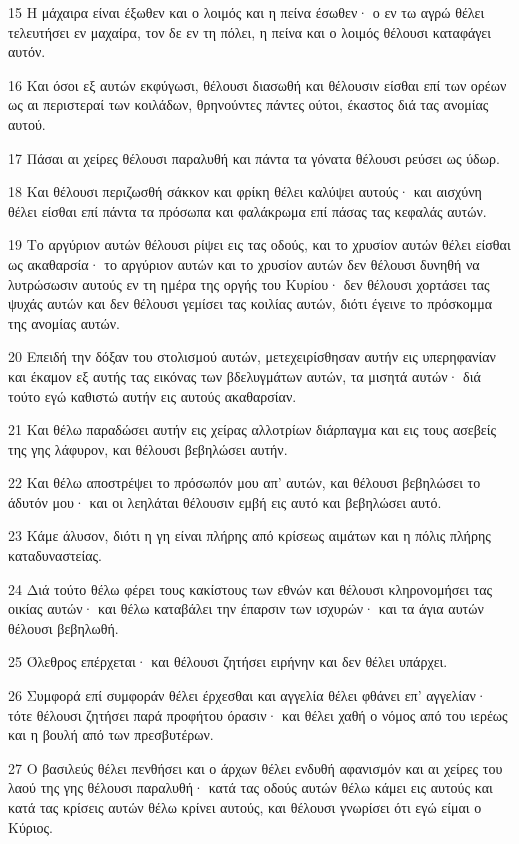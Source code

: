 \par 15 Η μάχαιρα είναι έξωθεν και ο λοιμός και η πείνα έσωθεν· ο εν τω αγρώ θέλει τελευτήσει εν μαχαίρα, τον δε εν τη πόλει, η πείνα και ο λοιμός θέλουσι καταφάγει αυτόν.
\par 16 Και όσοι εξ αυτών εκφύγωσι, θέλουσι διασωθή και θέλουσιν είσθαι επί των ορέων ως αι περιστεραί των κοιλάδων, θρηνούντες πάντες ούτοι, έκαστος διά τας ανομίας αυτού.
\par 17 Πάσαι αι χείρες θέλουσι παραλυθή και πάντα τα γόνατα θέλουσι ρεύσει ως ύδωρ.
\par 18 Και θέλουσι περιζωσθή σάκκον και φρίκη θέλει καλύψει αυτούς· και αισχύνη θέλει είσθαι επί πάντα τα πρόσωπα και φαλάκρωμα επί πάσας τας κεφαλάς αυτών.
\par 19 Το αργύριον αυτών θέλουσι ρίψει εις τας οδούς, και το χρυσίον αυτών θέλει είσθαι ως ακαθαρσία· το αργύριον αυτών και το χρυσίον αυτών δεν θέλουσι δυνηθή να λυτρώσωσιν αυτούς εν τη ημέρα της οργής του Κυρίου· δεν θέλουσι χορτάσει τας ψυχάς αυτών και δεν θέλουσι γεμίσει τας κοιλίας αυτών, διότι έγεινε το πρόσκομμα της ανομίας αυτών.
\par 20 Επειδή την δόξαν του στολισμού αυτών, μετεχειρίσθησαν αυτήν εις υπερηφανίαν και έκαμον εξ αυτής τας εικόνας των βδελυγμάτων αυτών, τα μισητά αυτών· διά τούτο εγώ καθιστώ αυτήν εις αυτούς ακαθαρσίαν.
\par 21 Και θέλω παραδώσει αυτήν εις χείρας αλλοτρίων διάρπαγμα και εις τους ασεβείς της γης λάφυρον, και θέλουσι βεβηλώσει αυτήν.
\par 22 Και θέλω αποστρέψει το πρόσωπόν μου απ' αυτών, και θέλουσι βεβηλώσει το άδυτόν μου· και οι λεηλάται θέλουσιν εμβή εις αυτό και βεβηλώσει αυτό.
\par 23 Κάμε άλυσον, διότι η γη είναι πλήρης από κρίσεως αιμάτων και η πόλις πλήρης καταδυναστείας.
\par 24 Διά τούτο θέλω φέρει τους κακίστους των εθνών και θέλουσι κληρονομήσει τας οικίας αυτών· και θέλω καταβάλει την έπαρσιν των ισχυρών· και τα άγια αυτών θέλουσι βεβηλωθή.
\par 25 Όλεθρος επέρχεται· και θέλουσι ζητήσει ειρήνην και δεν θέλει υπάρχει.
\par 26 Συμφορά επί συμφοράν θέλει έρχεσθαι και αγγελία θέλει φθάνει επ' αγγελίαν· τότε θέλουσι ζητήσει παρά προφήτου όρασιν· και θέλει χαθή ο νόμος από του ιερέως και η βουλή από των πρεσβυτέρων.
\par 27 Ο βασιλεύς θέλει πενθήσει και ο άρχων θέλει ενδυθή αφανισμόν και αι χείρες του λαού της γης θέλουσι παραλυθή· κατά τας οδούς αυτών θέλω κάμει εις αυτούς και κατά τας κρίσεις αυτών θέλω κρίνει αυτούς, και θέλουσι γνωρίσει ότι εγώ είμαι ο Κύριος.

